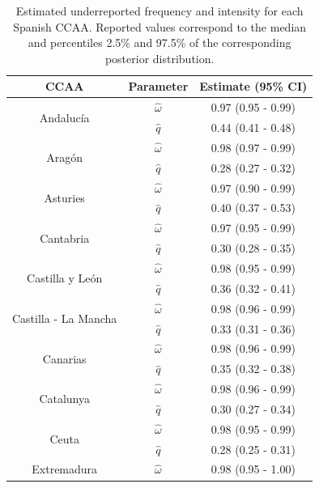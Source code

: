 \documentclass{article}
\begin{document}
\begin{table}[h]
\small\sf\centering
\caption{Estimated underreported frequency and intensity for each Spanish CCAA. Reported values correspond to the median and percentiles 2.5\% and 97.5\% of the corresponding posterior distribution.\label{tab:ccaa_est}}
\begin{tabular}{ccc}
\toprule
CCAA & Parameter & Estimate (95\% CI)\\
\midrule
\multirow{2}{*}{Andaluc\'ia}  & $\hat{\omega}$  & 0.97 (0.95 - 0.99) \\
                              & $\hat{q}$       & 0.44 (0.41 - 0.48) \\
\midrule
\multirow{2}{*}{Arag\'on}    & $\hat{\omega}$  & 0.98 (0.97 - 0.99) \\
                             & $\hat{q}$       & 0.28 (0.27 - 0.32) \\
\midrule
\multirow{2}{*}{Asturies}    & $\hat{\omega}$  & 0.97 (0.90 - 0.99) \\
                             & $\hat{q}$       & 0.40 (0.37 - 0.53) \\
\midrule
\multirow{2}{*}{Cantabria}    & $\hat{\omega}$  & 0.97 (0.95 - 0.99) \\
                              & $\hat{q}$       & 0.30 (0.28 - 0.35) \\
\midrule
\multirow{2}{*}{Castilla y Le\'on}    & $\hat{\omega}$  & 0.98 (0.95 - 0.99) \\
                                      & $\hat{q}$       & 0.36 (0.32 - 0.41) \\
\midrule
\multirow{2}{*}{Castilla - La Mancha}    & $\hat{\omega}$  & 0.98 (0.96 - 0.99) \\
                                         & $\hat{q}$       & 0.33 (0.31 - 0.36) \\
\midrule
\multirow{2}{*}{Canarias}    & $\hat{\omega}$  & 0.98 (0.96 - 0.99) \\
                             & $\hat{q}$       & 0.35 (0.32 - 0.38) \\
\midrule
\multirow{2}{*}{Catalunya}    & $\hat{\omega}$  & 0.98 (0.96 - 0.99) \\
                              & $\hat{q}$       & 0.30 (0.27 - 0.34) \\
\midrule
\multirow{2}{*}{Ceuta}    & $\hat{\omega}$  & 0.98 (0.95 - 0.99) \\
                          & $\hat{q}$       & 0.28 (0.25 - 0.31) \\
\midrule
\multirow{2}{*}{Extremadura}    & $\hat{\omega}$  & 0.98 (0.95 - 1.00) \\

\end{tabular}
\end{table}
\end{document}
